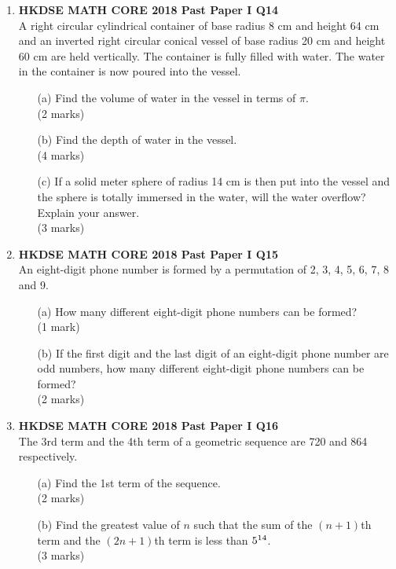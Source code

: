 \documentclass[12pt]{article}
\begin{document}
\begin{enumerate}
	\item \textbf{HKDSE MATH CORE 2018 Past Paper I Q14}\\
	A right circular cylindrical container of base radius 8 cm and height 64 cm and an inverted right circular conical vessel of base radius 20 cm and height 60 cm are held vertically. The container is fully filled with water. The water in the container is now poured into the vessel.
	\begin{enumerate}
		\item[(a)] Find the volume of water in the vessel in terms of $\pi$. \\(2 marks)
		\item[(b)] Find the depth of water in the vessel. \\(4 marks)
		\item[(c)] If a solid meter sphere of radius 14 cm is then put into the vessel and the sphere is totally immersed in the water, will the water overflow? Explain your answer. \\(3 marks)
	\end{enumerate}

	\item \textbf{HKDSE MATH CORE 2018 Past Paper I Q15}\\
	An eight-digit phone number is formed by a permutation of 2, 3, 4, 5, 6, 7, 8 and 9.
	\begin{enumerate}
		\item[(a)] How many different eight-digit phone numbers can be formed? \\(1 mark)
		\item[(b)] If the first digit and the last digit of an eight-digit phone number are odd numbers, how many different eight-digit phone numbers can be formed? \\(2 marks)
	\end{enumerate}

	\item \textbf{HKDSE MATH CORE 2018 Past Paper I Q16}\\
	The 3rd term and the 4th term of a geometric sequence are 720 and 864 respectively.
	\begin{enumerate}
		\item[(a)] Find the 1st term of the sequence. \\(2 marks)
		\item[(b)] Find the greatest value of $n$ such that the sum of the $(n + 1)$th term and the $(2n + 1)$th term is less than $5 \time 10^{14}$. \\(3 marks)
	\end{enumerate}


\end{enumerate}
\end{document}
